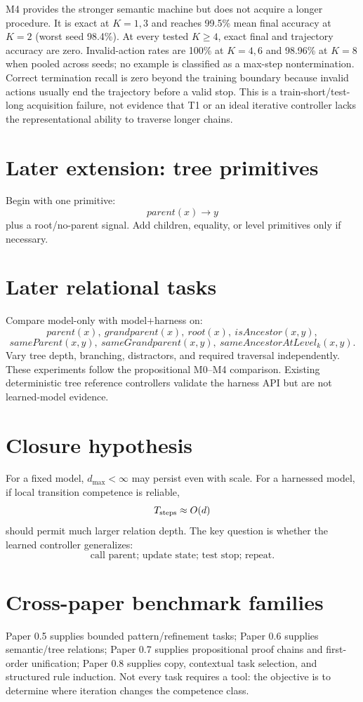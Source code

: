 \documentclass[10pt]{article}
\begin{document}
M4 provides the stronger semantic machine but does not acquire a longer procedure. It is exact at $K=1,3$ and reaches 99.5\% mean final accuracy at $K=2$ (worst seed 98.4\%). At every tested $K\ge4$, exact final and trajectory accuracy are zero. Invalid-action rates are 100\% at $K=4,6$ and 98.96\% at $K=8$ when pooled across seeds; no example is classified as a max-step nontermination. Correct termination recall is zero beyond the training boundary because invalid actions usually end the trajectory before a valid stop. This is a train-short/test-long acquisition failure, not evidence that T1 or an ideal iterative controller lacks the representational ability to traverse longer chains.

\section{Later extension: tree primitives}
Begin with one primitive:
\[
parent(x)\rightarrow y
\]
plus a root/no-parent signal. Add children, equality, or level primitives only if necessary.

\section{Later relational tasks}
Compare model-only with model+harness on:
\[
parent(x),\ grandparent(x),\ root(x),\ isAncestor(x,y),
\]
\[
sameParent(x,y),\ sameGrandparent(x,y),\ sameAncestorAtLevel_k(x,y).
\]
Vary tree depth, branching, distractors, and required traversal independently.
These experiments follow the propositional M0--M4 comparison. Existing deterministic tree reference controllers validate the harness API but are not learned-model evidence.

\section{Closure hypothesis}
For a fixed model, \(d_{\max}<\infty\) may persist even with scale. For a harnessed model, if local transition competence is reliable,
\[
T_{\rm steps}\approx O(d)
\]
should permit much larger relation depth. The key question is whether the learned controller generalizes:
\[
\text{call parent; update state; test stop; repeat}.
\]

\section{Cross-paper benchmark families}
Paper 0.5 supplies bounded pattern/refinement tasks; Paper 0.6 supplies semantic/tree relations; Paper 0.7 supplies propositional proof chains and first-order unification; Paper 0.8 supplies copy, contextual task selection, and structured rule induction. Not every task requires a tool: the objective is to determine where iteration changes the competence class.
\end{document}

